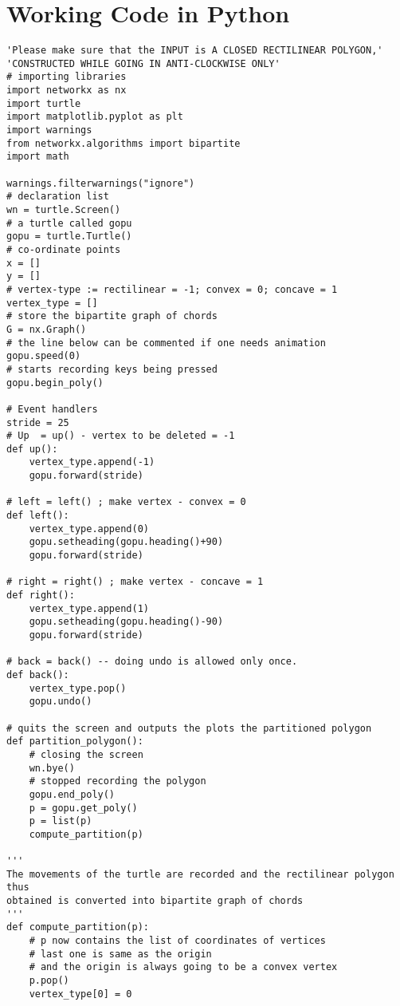 
\chapter{Working Code in Python} %

\label{AppendixA} %

\begin{lstlisting}
'Please make sure that the INPUT is A CLOSED RECTILINEAR POLYGON,'
'CONSTRUCTED WHILE GOING IN ANTI-CLOCKWISE ONLY'
# importing libraries
import networkx as nx
import turtle
import matplotlib.pyplot as plt
import warnings
from networkx.algorithms import bipartite
import math

warnings.filterwarnings("ignore")
# declaration list
wn = turtle.Screen()
# a turtle called gopu 
gopu = turtle.Turtle() 
# co-ordinate points
x = [] 
y = []
# vertex-type := rectilinear = -1; convex = 0; concave = 1 
vertex_type = [] 
# store the bipartite graph of chords
G = nx.Graph()
# the line below can be commented if one needs animation
gopu.speed(0)
# starts recording keys being pressed
gopu.begin_poly()

# Event handlers
stride = 25
# Up  = up() - vertex to be deleted = -1
def up():
    vertex_type.append(-1)
    gopu.forward(stride)
 
# left = left() ; make vertex - convex = 0
def left():
    vertex_type.append(0)
    gopu.setheading(gopu.heading()+90)
    gopu.forward(stride)
 
# right = right() ; make vertex - concave = 1
def right():
    vertex_type.append(1)
    gopu.setheading(gopu.heading()-90)
    gopu.forward(stride)
 
# back = back() -- doing undo is allowed only once.
def back():
    vertex_type.pop()
    gopu.undo()

# quits the screen and outputs the plots the partitioned polygon
def partition_polygon():
    # closing the screen
    wn.bye()
    # stopped recording the polygon
    gopu.end_poly()
    p = gopu.get_poly()
    p = list(p)
    compute_partition(p)  
    
'''
The movements of the turtle are recorded and the rectilinear polygon thus 
obtained is converted into bipartite graph of chords
'''
def compute_partition(p):
    # p now contains the list of coordinates of vertices
    # last one is same as the origin
    # and the origin is always going to be a convex vertex
    p.pop()
    vertex_type[0] = 0
    

\end{lstlisting}
